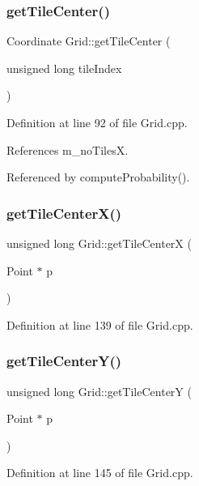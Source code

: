 \mbox{\label{class_grid_a4ad0db8034762fd6ca0c61df98bcc15f}} 
\subsubsection{get\+Tile\+Center()}
{\footnotesize\ttfamily Coordinate Grid\+::get\+Tile\+Center (\begin{DoxyParamCaption}\item[{unsigned long}]{tile\+Index }\end{DoxyParamCaption})}



Definition at line 92 of file Grid.\+cpp.



References m\+\_\+no\+TilesX.



Referenced by compute\+Probability().

\mbox{\label{class_grid_a7ceadaae2d94f814b7e9b69728cdb1be}} 
\subsubsection{get\+Tile\+Center\+X()}
{\footnotesize\ttfamily unsigned long Grid\+::get\+Tile\+CenterX (\begin{DoxyParamCaption}\item[{Point $\ast$}]{p }\end{DoxyParamCaption})}



Definition at line 139 of file Grid.\+cpp.

\mbox{\label{class_grid_a04b2390f9d507fffa738d2ec1c08f9b8}} 
\subsubsection{get\+Tile\+Center\+Y()}
{\footnotesize\ttfamily unsigned long Grid\+::get\+Tile\+CenterY (\begin{DoxyParamCaption}\item[{Point $\ast$}]{p }\end{DoxyParamCaption})}



Definition at line 145 of file Grid.\+cpp.

